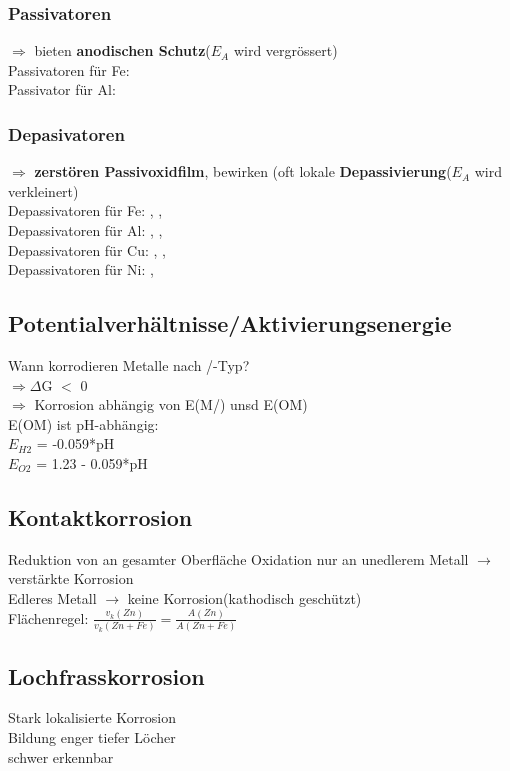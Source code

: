 \subsubsection{Passivatoren}
$\Rightarrow$ bieten \textbf{anodischen Schutz}($E_A$ wird vergrössert)\\
Passivatoren für Fe: \\
Passivator für Al: 
\subsubsection{Depasivatoren}
$\Rightarrow$ \textbf{zerstören Passivoxidfilm}, bewirken (oft lokale \textbf{Depassivierung}($E_A$ wird verkleinert)\\
Depassivatoren für Fe: \color{blue} \color{black}, \color{red} \color{black}, \\
Depassivatoren für Al: \color{blue} \color{black}, \color{red} \color{black}, \\
Depassivatoren für Cu: \color{blue} \color{black}, \color{red} \color{black}, \\
Depassivatoren für Ni: \color{blue} \color{black}, \color{red} \color{black}\\
\subsection{Potentialverhältnisse/Aktivierungsenergie}
Wann korrodieren Metalle nach /-Typ?\\
$\Rightarrow \Delta$G $<$ 0\\
$\Rightarrow$ Korrosion abhängig von E(M/) unsd E(OM)\\
E(OM) ist pH-abhängig:\\
$E_{H2}$ = -0.059*pH\\
$E_{O2}$ = 1.23 - 0.059*pH\\
\subsection{Kontaktkorrosion}
Reduktion von  an gesamter Oberfläche
Oxidation nur an unedlerem Metall $\rightarrow$ verstärkte Korrosion\\
Edleres Metall $\rightarrow$ keine Korrosion(kathodisch geschützt)\\
Flächenregel: $\frac{v_k(Zn)}{v_k(Zn + Fe)} = \frac{A(Zn)}{A(Zn + Fe)}$
\subsection{Lochfrasskorrosion}
Stark lokalisierte Korrosion\\
Bildung enger tiefer Löcher\\
schwer erkennbar\\
